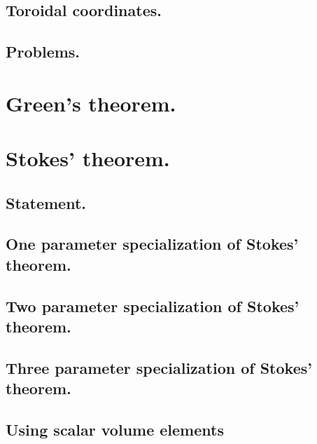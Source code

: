       \subsection{Toroidal coordinates.}
         

      \subsection{Problems.}
         
         

   \section{Green's theorem.}
      
   \section{Stokes' theorem.}
      \subsection{Statement.}
         
      \subsection{One parameter specialization of Stokes' theorem.}
         
      \subsection{Two parameter specialization of Stokes' theorem.}
         
      \subsection{Three parameter specialization of Stokes' theorem.}
         
      \subsection{Using scalar volume elements}
         
